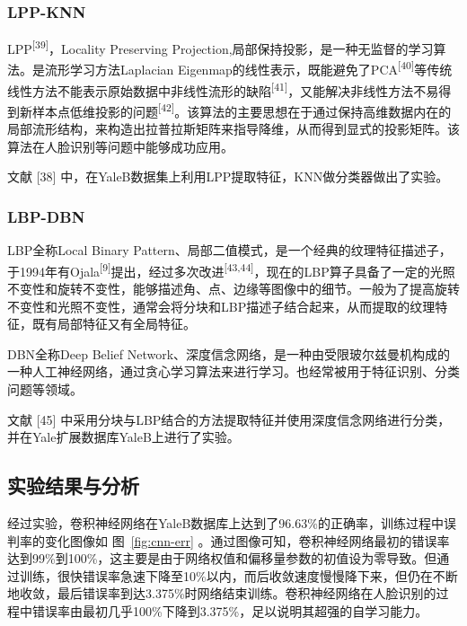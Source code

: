 \documentclass[bachelor,zhspacing]{cqu}  %
\begin{document}
\subsubsection{LPP-KNN}\label{lpp-knn}

LPP\textsuperscript{{[}39{]}}，Locality Preserving
Projection,局部保持投影，是一种无监督的学习算法。是流形学习方法Laplacian
Eigenmap的线性表示，既能避免了PCA\textsuperscript{{[}40{]}}等传统线性方法不能表示原始数据中非线性流形的缺陷\textsuperscript{{[}41{]}}，又能解决非线性方法不易得到新样本点低维投影的问题\textsuperscript{{[}42{]}}。该算法的主要思想在于通过保持高维数据内在的局部流形结构，来构造出拉普拉斯矩阵来指导降维，从而得到显式的投影矩阵。该算法在人脸识别等问题中能够成功应用。

文献 {[}38{]}
中，在YaleB数据集上利用LPP提取特征，KNN做分类器做出了实验。

\subsubsection{LBP-DBN}\label{lbp-dbn}

LBP全称Local Binary
Pattern、局部二值模式，是一个经典的纹理特征描述子，于1994年有Ojala\textsuperscript{{[}9{]}}提出，经过多次改进\textsuperscript{{[}43,44{]}}，现在的LBP算子具备了一定的光照不变性和旋转不变性，能够描述角、点、边缘等图像中的细节。一般为了提高旋转不变性和光照不变性，通常会将分块和LBP描述子结合起来，从而提取的纹理特征，既有局部特征又有全局特征。

DBN全称Deep Belief
Network、深度信念网络，是一种由受限玻尔兹曼机构成的一种人工神经网络，通过贪心学习算法来进行学习。也经常被用于特征识别、分类问题等领域。

文献 {[}45{]}
中采用分块与LBP结合的方法提取特征并使用深度信念网络进行分类，并在Yale扩展数据库YaleB上进行了实验。

\subsection{实验结果与分析}\label{ux5b9eux9a8cux7ed3ux679cux4e0eux5206ux6790}

经过实验，卷积神经网络在YaleB数据库上达到了96.63\%的正确率，训练过程中误判率的变化图像如
图~\ref{fig:cnn-err}
。通过图像可知，卷积神经网络最初的错误率达到99\%到100\%，这主要是由于网络权值和偏移量参数的初值设为零导致。但通过训练，很快错误率急速下降至10\%以内，而后收敛速度慢慢降下来，但仍在不断地收敛，最后错误率到达3.375\%时网络结束训练。卷积神经网络在人脸识别的过程中错误率由最初几乎100\%下降到3.375\%，足以说明其超强的自学习能力。
\end{document}
